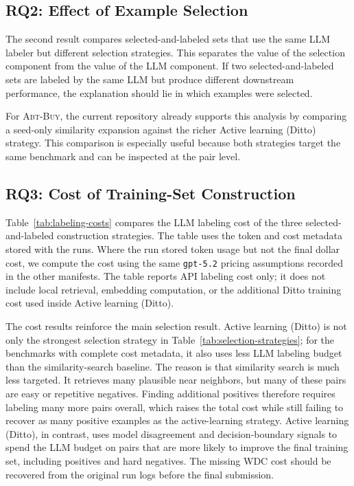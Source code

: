 \subsection{RQ2: Effect of Example Selection}

The second result compares selected-and-labeled sets that use the same LLM labeler but different selection strategies. This separates the value of the selection component from the value of the LLM component. If two selected-and-labeled sets are labeled by the same LLM but produce different downstream performance, the explanation should lie in which examples were selected.

For \textsc{Abt-Buy}, the current repository already supports this analysis by comparing a seed-only similarity expansion against the richer Active learning (Ditto) strategy. This comparison is especially useful because both strategies target the same benchmark and can be inspected at the pair level.

\subsection{RQ3: Cost of Training-Set Construction}

Table~\ref{tab:labeling-costs} compares the LLM labeling cost of the three selected-and-labeled construction strategies. The table uses the token and cost metadata stored with the runs. Where the run stored token usage but not the final dollar cost, we compute the cost using the same \texttt{gpt-5.2} pricing assumptions recorded in the other manifests. The table reports API labeling cost only; it does not include local retrieval, embedding computation, or the additional Ditto training cost used inside Active learning (Ditto).


The cost results reinforce the main selection result. Active learning (Ditto) is not only the strongest selection strategy in Table~\ref{tab:selection-strategies}; for the benchmarks with complete cost metadata, it also uses less LLM labeling budget than the similarity-search baseline. The reason is that similarity search is much less targeted. It retrieves many plausible near neighbors, but many of these pairs are easy or repetitive negatives. Finding additional positives therefore requires labeling many more pairs overall, which raises the total cost while still failing to recover as many positive examples as the active-learning strategy. Active learning (Ditto), in contrast, uses model disagreement and decision-boundary signals to spend the LLM budget on pairs that are more likely to improve the final training set, including positives and hard negatives. The missing \textsc{WDC} cost should be recovered from the original run logs before the final submission.

